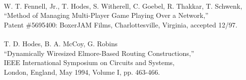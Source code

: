 \begin{tabbing}
\smallskip \\
\>	W. T. Fennell, Jr., T. Hodes, S. Witherell, C. Goebel, 
	R. Thakkar, T. Schwenk, \\
\>\>	``Method of Managing Multi-Player Game Playing Over a Network,''  \\
\>\>	Patent \#5695400: BoxerJAM Films, Charlottesville, Virginia, accepted 12/97.  \\
\smallskip \\
\>    T. D. Hodes, B. A. McCoy, G. Robins \\
\>\>  ``Dynamically Wiresized Elmore-Based Routing Constructions,''  \\
\> IEEE International Symposium on Circuits and Systems, \\
\>\>   London, England, May 1994, Volume I, pp. 463-466. \\
\end{tabbing}








